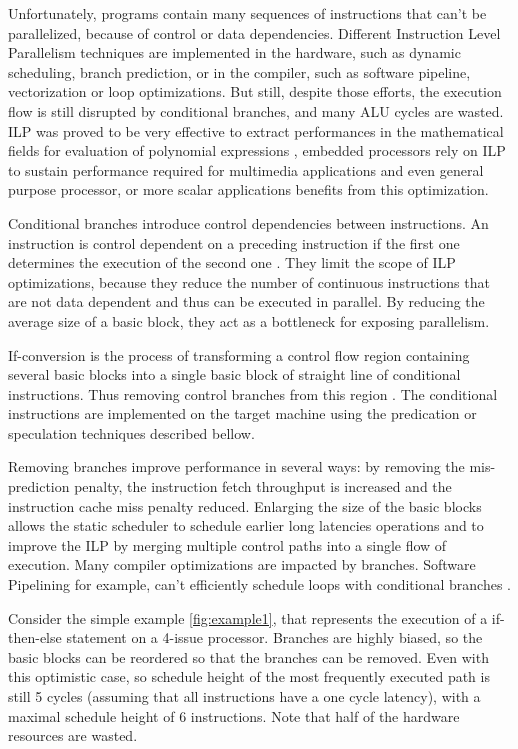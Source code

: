 Unfortunately, programs contain many sequences of instructions that can't be parallelized, because of control or data dependencies. Different Instruction Level Parallelism techniques are implemented in the hardware, such as dynamic scheduling, branch prediction, or in the compiler, such as software pipeline, vectorization or loop optimizations. But still, despite those efforts, the execution flow is still disrupted by conditional branches, and many ALU cycles are wasted. ILP was proved to be very effective to extract performances in the mathematical fields for evaluation of polynomial expressions \cite{Jeannerod:2010:TTI:1837210.1837212}, embedded processors rely on ILP to sustain performance required for multimedia applications \cite{FisherFaraboshiYoung} and even general purpose processor, or more scalar applications benefits from this optimization.

Conditional branches introduce control dependencies between instructions. An instruction is control dependent on a preceding instruction if the first one determines the execution of the second one \cite{Kennedy:2001:OCM:502981}. They limit the scope of ILP optimizations, because they reduce the number of continuous instructions that are not data dependent and thus can be executed in parallel. By reducing the average size of a basic block, they act as a bottleneck for exposing parallelism.

If-conversion is the process of transforming a control flow region containing several basic blocks into a single basic block of straight line of conditional instructions. Thus removing control branches from this region \cite{Schlansker97achievinghigh}. The conditional instructions are implemented on the target machine using the predication or speculation techniques described bellow. 

Removing branches improve performance in several ways: by removing the mis-prediction penalty, the instruction fetch throughput is increased and the instruction cache miss penalty reduced. Enlarging the size of the basic blocks allows the static scheduler to schedule earlier long latencies operations and to improve the ILP by merging multiple control paths into a single flow of execution. Many compiler optimizations are impacted by branches. Software Pipelining for example, can't efficiently schedule loops with conditional branches \cite{Warter:1992:EMS:144953.145796}.

Consider the simple example \ref{fig:example1}, that represents the execution of a if-then-else statement on a 4-issue processor. Branches are highly biased, so the basic blocks can be reordered so that the branches can be removed. Even with this optimistic case, so schedule height of the most frequently executed path is still 5 cycles (assuming that all instructions have a one cycle latency), with a maximal schedule height of 6 instructions. Note that half of the hardware resources are wasted.

